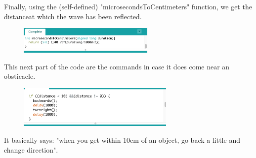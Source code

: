 \documentclass[final,3p,times]{article}
\begin{document}
Finally, using the (self-defined) "microsecondsToCentimeters" function, we get the distanceat which the wave has been reflected.
\begin{figure}[!h]
\includegraphics[trim={0cm 0cm 0cm 0cm}, clip, width=2.6in]{./media/sonarDistanceFunction.jpg}
\end{figure}

This next part of the code are the commands in case it does come near an obsticacle.
\begin{figure}[h!]
\includegraphics[trim={0cm 0cm 0cm 0cm}, clip, width=3in]{./media/obstacleAvoidance.jpg}
\end{figure}
It basically says: "when you get within 10cm of an object, go back a little and change direction".
\end{document}
